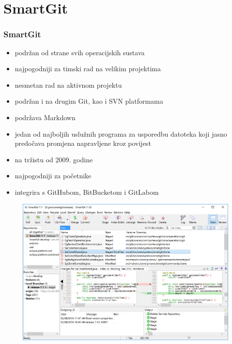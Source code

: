 \section{SmartGit}
\begin{frame}[allowframebreaks]
\frametitle{SmartGit}
 
\begin{itemize}
 \item podržan od strane svih operacijskih sustava
 \item najpogodniji za timski rad na velikim projektima
 \item nesmetan rad na aktivnom projektu
 \item podržan i na drugim Git, kao i SVN platformama
 \item podržava Markdown
 \item jedan od najboljih uslužnih programa za usporedbu datoteka koji jasno predočava promjena napravljene kroz povijest
 \framebreak
 \item na tržistu od 2009. godine
 \item najpogodniji za početnike
 \item integrira s GitHubom, BitBucketom i GitLabom
\end{itemize}

\begin{figure}[h]
	\centering
	\includegraphics[width=0.9\linewidth]{images/git-project.png}
\end{figure}
\end{frame}
